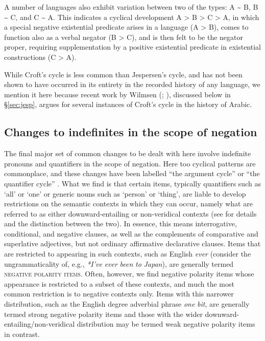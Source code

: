 \documentclass[output=paper]{langsci/langscibook}
\begin{document}
A number of languages also exhibit variation between two of the types: A {\textasciitilde} B, B {\textasciitilde} C, and C {\textasciitilde} A. This indicates a cyclical development A > B > C > A, in which a special negative existential predicate arises in a language (A > B), comes to function also as a verbal negator (B > C), and is then felt to be the negator proper, requiring supplementation by a positive existential predicate in existential constructions (C > A). 

While Croft’s cycle is less common than Jespersen’s cycle, and has not been shown to have occurred in its entirety in the recorded history of any language, we mention it here because recent work by Wilmsen (\citeyear[174–176]{Wilmsen2014}; \citeyear{Wilmsen2016}), discussed below in §\ref{sec:jesp}, argues for several instances of Croft’s cycle in the history of Arabic.



\subsection{Changes to indefinites in the scope of negation}\label{sec:ind}


The final major set of common changes to be dealt with here involve indefinite pronouns and quantifiers in the scope of negation. Here too cyclical patterns are commonplace, and these changes have been labelled “the argument cycle” \citep{Ladusaw1993} or “the quantifier cycle” \citep{Willis2011}. What we find is that certain items, typically quantifiers such as ‘all’ or ‘one’ or generic nouns such as ‘person’ or ‘thing’, are liable to develop restrictions on the semantic contexts in which they can occur, namely what are referred to as either downward-entailing or non-veridical contexts (see \citealt{Giannakidou1998} for details and the distinction between the two). In essence, this means interrogative, conditional, and negative clauses, as well as the complements of comparative and superlative adjectives, but not ordinary affirmative declarative clauses. Items that are restricted to appearing in such contexts, such as English \textit{ever} (consider the ungrammaticality of, e.g., \textit{*I’ve} \textit{ever} \textit{been} \textit{to} \textit{Japan}), are generally termed \textsc{negative} \textsc{polarity} \textsc{items}. Often, however, we find negative polarity items whose appearance is restricted to a subset of these contexts, and much the most common restriction is to negative contexts only. Items with this narrower distribution, such as the English degree adverbial phrase \textit{one} \textit{bit}, are generally termed strong negative polarity items and those with the wider downward-entailing/non-veridical distribution may be termed weak negative polarity items in contrast. 
\end{document}
